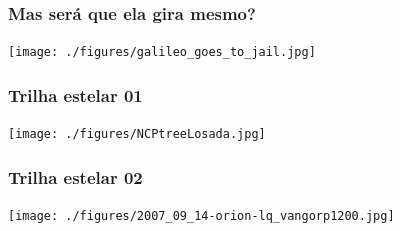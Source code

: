 \begin{frame}
  \frametitle{Mas será que ela gira mesmo?}
  \begin{center}
    \texttt{[image: ./figures/galileo\_goes\_to\_jail.jpg]}
  \end{center}
\end{frame}


\begin{frame}
  \frametitle{Trilha estelar 01}
  \begin{center}
    \texttt{[image: ./figures/NCPtreeLosada.jpg]}
  \end{center}
\end{frame}


\begin{frame}
  \frametitle{Trilha estelar 02}
  \begin{center}
    \texttt{[image: ./figures/2007\_09\_14-orion-lq\_vangorp1200.jpg]}
  \end{center}
\end{frame}


